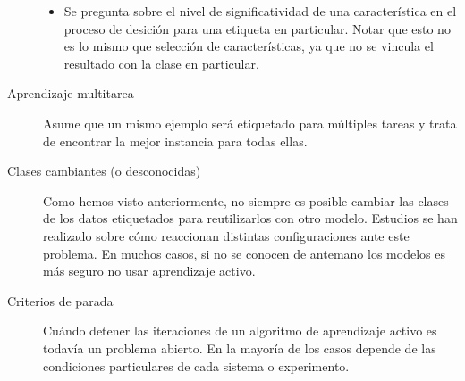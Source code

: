 \documentclass[11pt,spanish]{article}
\begin{document}
\begin{description}
\begin{itemize}
        \item Se pregunta sobre el nivel de significatividad de una
        característica en el proceso de desición para una etiqueta en
        particular. Notar que esto no es lo mismo que selección de
        características, ya que no se vincula el resultado con la clase en
        particular.
    \end{itemize}
    \item[Aprendizaje multitarea] Asume que un mismo ejemplo será etiquetado
    para múltiples tareas y trata de encontrar la mejor instancia para todas
    ellas.
    \item[Clases cambiantes (o desconocidas)] Como hemos visto anteriormente,
    no siempre es posible cambiar las clases de los datos etiquetados para
    reutilizarlos con otro modelo. Estudios se han realizado sobre cómo
    reaccionan distintas configuraciones ante este problema. En muchos casos,
    si no se conocen de antemano los modelos es más seguro no usar aprendizaje
    activo.
    \item[Criterios de parada] Cuándo detener las iteraciones de un algoritmo
    de aprendizaje activo es todavía un problema abierto. En la mayoría de los
    casos depende de las condiciones particulares de cada sistema o experimento.
\end{description}
\end{document}
